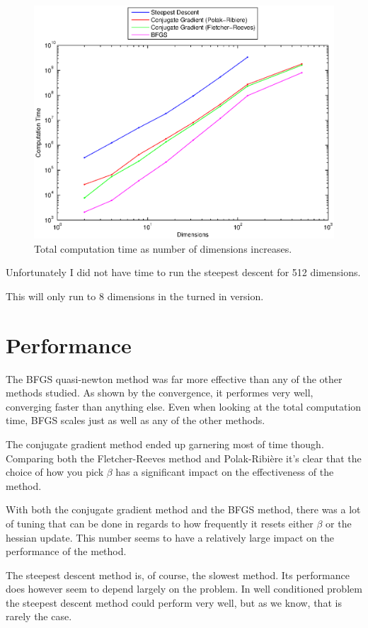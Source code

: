 \documentclass[12pt,parskip=full]{article}
\numberwithin{subsection}{section}
\begin{document}
			\begin{figure}[!ht]
				\centering
				\includegraphics[scale=0.5]{DimensionEffectTime.eps}
				\caption{Total computation time as number of dimensions increases.\label{fig:IncDimT}}
			\end{figure}
			
			Unfortunately I did not have time to run the steepest descent for 512 dimensions.
			
			This will only run to 8 dimensions in the turned in version.
	
	\pagebreak
	\section{Performance}
		The BFGS quasi-newton method was far more effective than any of the other methods studied. As shown by
		the convergence, it performes very well, converging faster than anything else. Even when looking at
		the total computation time, BFGS scales just as well as any of the other methods.
		
		The conjugate gradient method ended up garnering most of time though. Comparing both the Fletcher-Reeves
		method and Polak-Ribi\`{e}re it's clear that the choice of how you pick $\beta$ has a significant impact
		on the effectiveness of the method.
		
		With both the conjugate gradient method and the BFGS method, there was a lot of tuning that can be done
		in regards to how frequently it resets either $\beta$ or the hessian update. This number seems to have
		a relatively large impact on the performance of the method.
		
		The steepest descent method is, of course, the slowest method. Its performance does however seem to
		depend largely on the problem. In well conditioned problem the steepest descent method could perform
		very well, but as we know, that is rarely the case.
\end{document}
